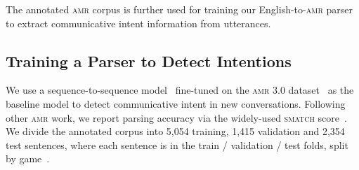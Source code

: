 \documentclass[oneside]{memoir}
\newcommand{\abr}[1]{\textsc{#1}}
\begin{document}
The annotated \abr{amr} corpus is further used for
training our English-to-\abr{amr} parser to extract communicative intent information from
utterances.

\subsection{Training a Parser to Detect Intentions}
\label{sec:amr_parser}

We use a sequence-to-sequence
model~\cite{amrlib2023}
fine-tuned on the \abr{amr} 3.0 dataset~\cite{LDC2020} as the baseline model to detect
communicative intent in new conversations.
%
Following other \abr{amr} work, we report parsing accuracy via the
widely-used \abr{smatch} score~\cite{cai-knight-2013-smatch}.
% 
We divide the annotated corpus into 5,054 training, 1,415 validation
and 2,354 test sentences, where each sentence is in the train /
validation / test folds, split by game~\citep{peskov2020takes}.




%
\end{document}
